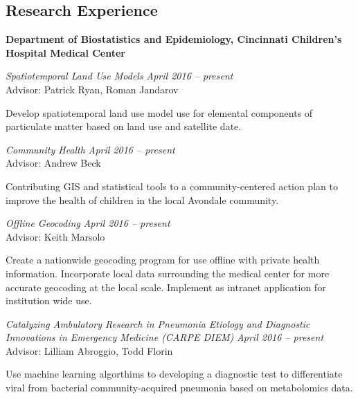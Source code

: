 \documentclass[margin,line]{res}
\newenvironment{list1}{
  \begin{list}{\ding{113}}{%
      \setlength{\itemsep}{0in}
      \setlength{\parsep}{0in} \setlength{\parskip}{0in}
      \setlength{\topsep}{0in} \setlength{\partopsep}{0in} 
      \setlength{\leftmargin}{0.17in}}}{\end{list}}
\begin{document}
\begin{resume}
\section{\sc Research Experience}

\textbf{Department of Biostatistics and Epidemiology, Cincinnati Children's Hospital Medical Center} \\

\vspace{-0.2in}

\textsl{Spatiotemporal Land Use Models}
\hfill \textit{April 2016 -- present} \\
Advisor: Patrick Ryan, Roman Jandarov\\
\vspace{-0.13in}
\begin{list1}
    \item[]Develop spatiotemporal land use model use for elemental components of particulate matter based on land use and satellite date.
\end{list1}

\textsl{Community Health}
\hfill \textit{April 2016 -- present} \\
Advisor: Andrew Beck\\
\vspace{-0.13in}
\begin{list1}
    \item[]Contributing GIS and statistical tools to a community-centered action plan to improve the health of children in the local Avondale community.
\end{list1}


\textsl{Offline Geocoding}
\hfill \textit{April 2016 -- present} \\
Advisor: Keith Marsolo\\
\vspace{-0.13in}
\begin{list1}
    \item[]Create a nationwide geocoding program for use offline with private health information.  Incorporate local data surrounding the medical center for more accurate geocoding at the local scale. Implement as intranet application for institution wide use.
\end{list1}

\textsl{Catalyzing Ambulatory Research in Pneumonia Etiology and Diagnostic Innovations in Emergency Medicine (CARPE DIEM)}
\hfill \textit{April 2016 -- present} \\
Advisor: Lilliam Abroggio, Todd Florin\\
\vspace{-0.13in}
\begin{list1}
    \item[]Use machine learning algorthims to developing a diagnostic test to differentiate viral from bacterial community-acquired pneumonia based on metabolomics data.
\end{list1}



\end{resume}
\end{document}
